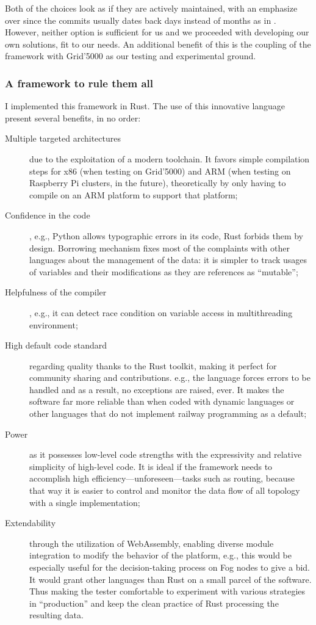 Both of the choices look as if they are actively maintained, with an emphasize over \cite{smartfog_fogflow_2022} since the commits usually dates back days instead of months as in \cite{deng_fogbus2_2021}.
However, neither option is  sufficient for us and we proceeded with developing our own solutions, fit to our needs. An additional benefit of this is the coupling of the framework with Grid'5000 as our testing and experimental ground.

\subsubsection{A framework to rule them all}

I implemented this framework in Rust. The use of this innovative language present several benefits, in no order:
\begin{description}
	\item[Multiple targeted architectures]due to the exploitation of a modern toolchain. It favors simple compilation steps for x86 (when testing on Grid’5000) and ARM (when testing on Raspberry Pi clusters, in the future), theoretically by only having to compile on an ARM platform to support that platform;
	\item[Confidence in the code], e.g., Python allows typographic errors in its code, Rust forbids them by design. Borrowing mechanism fixes most of the complaints with other languages about the management of the data: it is simpler to track usages of variables and their modifications as they are references as “mutable”;
	\item[Helpfulness of the compiler], e.g., it can detect race condition on variable access in multithreading environment;
	\item[High default code standard]regarding quality thanks to the Rust toolkit, making it perfect for community sharing and contributions. e.g., the language forces errors to be handled and as a result, no exceptions are raised, ever. It makes the software far more reliable than when coded with dynamic languages or other languages that do not implement railway programming as a default;
	\item[Power] as it possesses low-level code strengths with the expressivity and relative simplicity of high-level code. It is ideal if the framework needs to accomplish high efficiency—unforeseen—tasks such as routing, because that way it is easier to control and monitor the data flow of all topology with a single implementation;
	\item[Extendability]through the utilization of WebAssembly, enabling diverse module integration to modify the behavior of the platform, e.g., this would be especially useful for the decision-taking process on Fog nodes to give a bid. It would grant other languages than Rust on a small parcel of the software. Thus making the tester comfortable to experiment with various strategies in “production” and keep the clean practice of Rust processing the resulting data.
\end{description}

